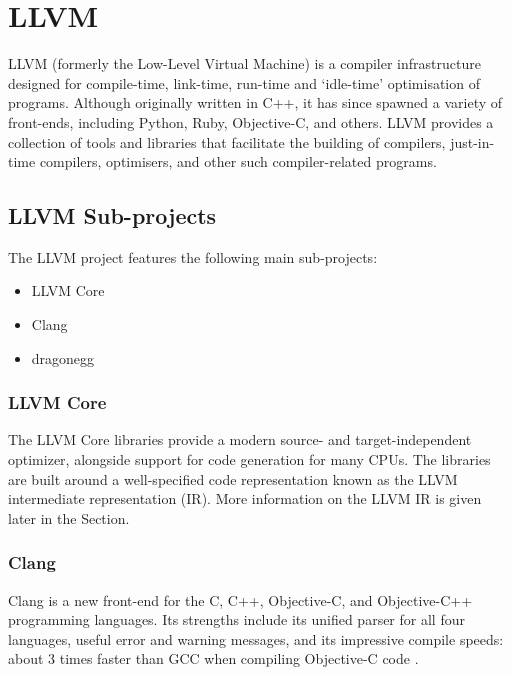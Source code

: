 \section{LLVM}
\label{sec:llvm}

LLVM (formerly the Low-Level Virtual Machine\footnotemark {}) is a compiler infrastructure designed for compile-time, link-time, run-time and `idle-time' optimisation of programs.  Although originally written in C++, it has since spawned a variety of front-ends, including Python, Ruby, Objective-C, and others. LLVM provides a collection of tools and libraries that facilitate the building of compilers, just-in-time compilers, optimisers, and other such compiler-related programs.

\subsection*{LLVM Sub-projects}

The LLVM project features the following main sub-projects:

\begin{itemize}
\item LLVM Core
\item Clang
\item dragonegg
\end{itemize}

\subsubsection*{LLVM Core}

The LLVM Core libraries provide a modern source- and target-independent optimizer, alongside support for code generation for many CPUs. The libraries are built around a well-specified code representation known as the LLVM intermediate representation (IR). More information on the LLVM IR is given later in the Section.

\subsubsection*{Clang}

Clang is a new front-end for the C, C++, Objective-C, and Objective-C++ programming languages. Its strengths include its unified parser for all four languages, useful error and warning messages, and its impressive compile speeds: about 3 times faster than GCC when compiling Objective-C code \cite{clang_performance}.

